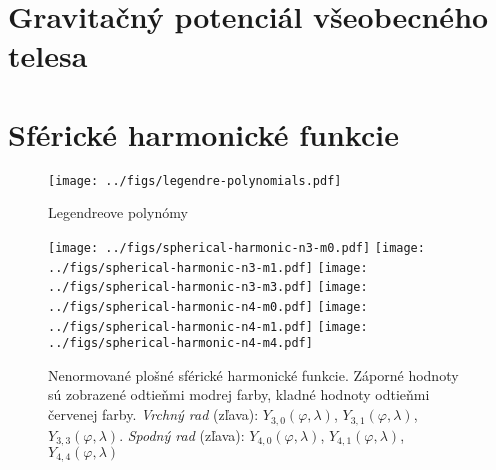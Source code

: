 \documentclass[a4paper, 12pt]{book}
\begin{document}

\chapter{Gravitačný potenciál všeobecného telesa}








\chapter{Sférické harmonické funkcie}




\begin{figure}[bt]
\centering
\texttt{[image: ../figs/legendre-polynomials.pdf]}
\caption{Legendreove polynómy}
\end{figure}




\begin{figure}[bt]
\centering
\texttt{[image: ../figs/spherical-harmonic-n3-m0.pdf]}
\texttt{[image: ../figs/spherical-harmonic-n3-m1.pdf]}
\texttt{[image: ../figs/spherical-harmonic-n3-m3.pdf]}
\texttt{[image: ../figs/spherical-harmonic-n4-m0.pdf]}
\texttt{[image: ../figs/spherical-harmonic-n4-m1.pdf]}
\texttt{[image: ../figs/spherical-harmonic-n4-m4.pdf]}
\caption{Nenormované plošné sférické harmonické funkcie.  Záporné hodnoty sú 
zobrazené odtieňmi modrej farby, kladné hodnoty odtieňmi červenej farby.  
\textit{Vrchný rad} (zľava): $Y_{3,0}(\varphi, \lambda)$, $Y_{3,1}(\varphi, 
\lambda)$, $Y_{3,3}(\varphi, \lambda)$.  \textit{Spodný rad} (zľava): 
$Y_{4,0}(\varphi, \lambda)$, $Y_{4,1}(\varphi, \lambda)$, $Y_{4,4}(\varphi, 
\lambda)$}
\label{fig:sh}
\end{figure}
\end{document}
